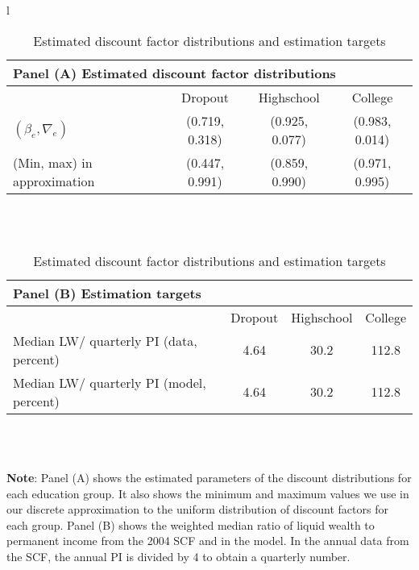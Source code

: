 \documentclass[\econtexRoot/HAFiscal]{subfiles}
\begin{document}
\begin{table}[th]
  \begin{center}
    \begin{tabular}{l}
      \begin{tabular}{lccc}
        \multicolumn{4}{l}{Panel (A) Estimated discount factor distributions} \\ \midrule
        & Dropout & Highschool & College \\ \midrule
        $(\beta_e, \nabla_e)$ & (0.719, 0.318) & (0.925, 0.077) & (0.983, 0.014) \\
        (Min, max) in approximation & (0.447, 0.991) & (0.859, 0.990) & (0.971, 0.995) \\
        \midrule 
      \end{tabular} \\ \\ 
      
      \begin{tabular}{lccc}
        \multicolumn{4}{l}{Panel (B) Estimation targets} \\ \midrule
        & Dropout & Highschool & College \\ \midrule
        Median LW/ quarterly PI (data, percent) & 4.64 & 30.2 & 112.8 \\ 
        Median LW/ quarterly PI (model, percent) & 4.64 & 30.2 & 112.8 %
        \\ \midrule 
      \end{tabular} \\ \\ 
    \end{tabular}
    \caption{Estimated discount factor distributions and estimation targets}
    \notinsubfile{\label{tab:estimBetas}}
    \parbox{16cm}{\small \vspace{.15cm} \textbf{Note}: Panel (A) shows the estimated parameters of the discount distributions for each education group.
It also shows the minimum and maximum values we use in our discrete approximation to the uniform distribution of discount factors for each group. Panel (B) shows the weighted median ratio of liquid wealth to permanent income from the 2004 SCF and in the model.
In the annual data from the SCF, the annual PI is divided by 4 to obtain a quarterly number.\normalsize}
  \end{center}
\end{table}
\end{document}
